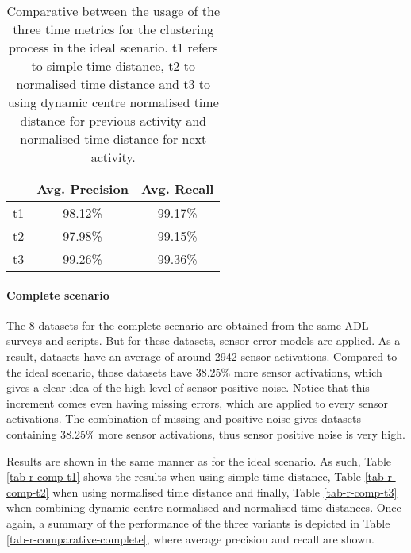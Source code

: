 \begin{table}[htbp]\scriptsize
\begin{center}
 \begin{tabular}{ccc}
  \hline
   & Avg. Precision & Avg. Recall \\
  \hline
  t1 & 98.12\% & 99.17\% \\
  t2 & 97.98\% & 99.15\% \\
  t3 & 99.26\% & 99.36\% \\
  \hline
 \end{tabular}
 \caption{Comparative between the usage of the three time metrics for the clustering process in the ideal scenario. t1 refers to simple time distance, t2 to normalised time distance and t3 to using dynamic centre normalised time distance for previous activity and normalised time distance for next activity.}
 \label{tab-r-comparative-ideal}
\end{center} 
\end{table}

\paragraph*{Complete scenario}

The 8 datasets for the complete scenario are obtained from the same ADL surveys and scripts. But for these datasets, sensor error models are applied. As a result, datasets have an average of around 2942 sensor activations. Compared to the ideal scenario, those datasets have 38.25\% more sensor activations, which gives a clear idea of the high level of sensor positive noise. Notice that this increment comes even having missing errors, which are applied to every sensor activations. The combination of missing and positive noise gives datasets containing 38.25\% more sensor activations, thus sensor positive noise is very high. 

Results are shown in the same manner as for the ideal scenario. As such, Table \ref{tab-r-comp-t1} shows the results when using simple time distance, Table \ref{tab-r-comp-t2} when using normalised time distance and finally, Table \ref{tab-r-comp-t3} when combining dynamic centre normalised and normalised time distances. Once again, a summary of the performance of the three variants is depicted in Table \ref{tab-r-comparative-complete}, where average precision and recall are shown.
       
